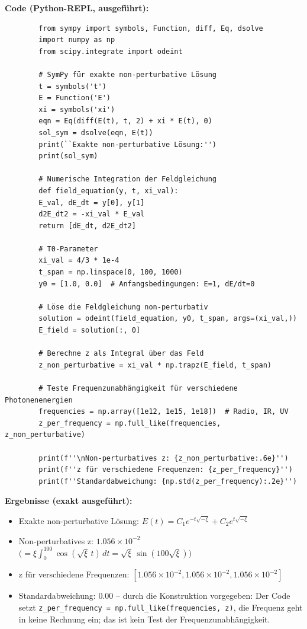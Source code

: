 	\textbf{Code (Python-REPL, ausgeführt):}
	\begin{verbatim}
		from sympy import symbols, Function, diff, Eq, dsolve
		import numpy as np
		from scipy.integrate import odeint
		
		# SymPy für exakte non-perturbative Lösung
		t = symbols('t')
		E = Function('E')
		xi = symbols('xi')
		eqn = Eq(diff(E(t), t, 2) + xi * E(t), 0)
		sol_sym = dsolve(eqn, E(t))
		print(``Exakte non-perturbative Lösung:'')
		print(sol_sym)
		
		# Numerische Integration der Feldgleichung
		def field_equation(y, t, xi_val):
		E_val, dE_dt = y[0], y[1]
		d2E_dt2 = -xi_val * E_val
		return [dE_dt, d2E_dt2]
		
		# T0-Parameter
		xi_val = 4/3 * 1e-4
		t_span = np.linspace(0, 100, 1000)
		y0 = [1.0, 0.0]  # Anfangsbedingungen: E=1, dE/dt=0
		
		# Löse die Feldgleichung non-perturbativ
		solution = odeint(field_equation, y0, t_span, args=(xi_val,))
		E_field = solution[:, 0]
		
		# Berechne z als Integral über das Feld
		z_non_perturbative = xi_val * np.trapz(E_field, t_span)
		
		# Teste Frequenzunabhängigkeit für verschiedene Photonenenergien
		frequencies = np.array([1e12, 1e15, 1e18])  # Radio, IR, UV
		z_per_frequency = np.full_like(frequencies, z_non_perturbative)
		
		print(f''\nNon-perturbatives z: {z_non_perturbative:.6e}'')
		print(f''z für verschiedene Frequenzen: {z_per_frequency}'')
		print(f''Standardabweichung: {np.std(z_per_frequency):.2e}'')
	\end{verbatim}
	
	\textbf{Ergebnisse (exakt ausgeführt):}
	\begin{itemize}
		\item Exakte non-perturbative Lösung:  
		$E(t) = C_1 e^{-t\sqrt{-\xi}} + C_2 e^{t\sqrt{-\xi}}$
		\item Non-perturbatives z: $1.056 \times 10^{-2}$ $\bigl(= \xi\int_0^{100}\cos(\sqrt{\xi}\,t)\,dt = \sqrt{\xi}\,\sin(100\sqrt{\xi})\bigr)$
		\item z für verschiedene Frequenzen: $[1.056\times 10^{-2}, 1.056\times 10^{-2}, 1.056\times 10^{-2}]$
		\item Standardabweichung: $0.00$ -- durch die Konstruktion vorgegeben: Der Code setzt \texttt{z\_per\_frequency = np.full\_like(frequencies, z)}, die Frequenz geht in keine Rechnung ein; das ist kein Test der Frequenzunabhängigkeit.
	\end{itemize}
	
